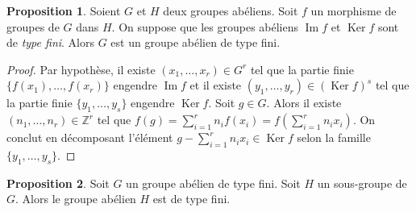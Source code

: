 \documentclass{article}
\newcommand{\Z}{\mathbb{Z}}
\newcommand{\im}{\mathop{\mathrm{Im}}\nolimits}
\renewcommand{\ker}{\mathop{\mathrm{Ker}}\nolimits}
\newcommand{\dis}{\displaystyle}
\theoremstyle{definition}
\newtheorem{prop}{Proposition}
\theoremstyle{remark}
\begin{document}
\begin{prop}\label{g-type-fini-par-morphisme}
Soient $G$ et $H$ deux groupes abéliens. Soit $f$ un morphisme de groupes de $G$ dans $H$. On suppose que les groupes abéliens $\im f$ et $\ker f$ sont de \textit{type fini}. Alors $G$ est un groupe abélien de type fini.
\end{prop}

\begin{proof}
Par hypothèse, il existe $(x_1, \ldots, x_r) \in G^r$ tel que la partie finie $\{f(x_1), \ldots, f(x_r) \}$ engendre $\im f$ et il existe $(y_1, \ldots, y_r) \in (\ker f)^s$ tel que la partie finie $\{y_1, \ldots, y_s \}$ engendre $\ker f$. Soit $g \in G$. Alors il existe $(n_1, \ldots, n_r) \in \Z^r$ tel que $f(g)=\dis \sum_{i=1}^r n_if(x_i)=f\left(\sum_{i=1}^r n_ix_i\right)$. On conclut en décomposant l'élément $g-\dis \sum_{i=1}^r n_ix_i\in \ker f$ selon la famille $\{y_1, \ldots, y_s\}$.
\end{proof}

\begin{prop}
Soit $G$ un groupe abélien de type fini. Soit $H$ un sous-groupe de $G$. Alors le groupe abélien $H$ est de type fini.
\end{prop}
\end{document}
